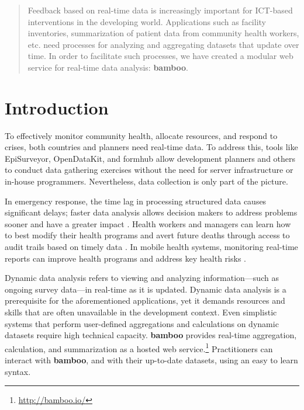 \documentclass{sig-alternate}
\begin{document}
\maketitle
\begin{abstract}
Feedback based on real-time data is increasingly important for ICT-based interventions in the developing world. Applications such as 
facility inventories,
summarization of patient data from community health workers, 
etc. need processes for analyzing and aggregating datasets that update over
time. In order to facilitate such processes, we have created a modular web
service for real-time data analysis: \textbf{bamboo}.
\end{abstract}




\section{Introduction}
To effectively monitor community health, allocate resources, and respond to crises, both countries and planners need real-time data. 
To address this, tools like EpiSurveyor, OpenDataKit, and
formhub allow development planners and others to conduct data gathering exercises without the need for server infrastructure or in-house programmers.  
Nevertheless, data collection is only part of the picture.

In emergency response, the time lag in processing structured data causes significant delays; faster data analysis allows decision makers to address problems sooner and have a greater impact \cite{internews}.
Health workers and managers can learn how to best modify their health programs
and avert future deaths
through access to audit trails based on timely data \cite{krisberg}.
In mobile health systems, monitoring real-time reports can improve health programs and address key health risks \cite{mechael}.  

Dynamic data analysis refers to viewing and analyzing information---such as
ongoing survey data---in real-time as it is updated.  Dynamic data analysis is a prerequisite for the
aforementioned applications, yet it demands resources
and skills that are often unavailable in the development context.  Even
simplistic systems that perform user-defined aggregations and calculations on
dynamic datasets require high technical capacity.  \textbf{bamboo} provides real-time
aggregation, calculation, and summarization as a hosted web
service.\footnote{\url{http://bamboo.io/}}  Practitioners can interact with
\textbf{bamboo}, and with their up-to-date datasets, using an easy to learn syntax.
\end{document}
